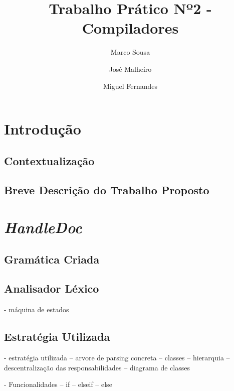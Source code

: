 \documentclass[runningheads]{llncs}
\begin{document}
%
\title{Trabalho Prático Nº2 - Compiladores}
%
%
\author{Marco Sousa \and
José Malheiro \and
Miguel Fernandes}
%
%
\maketitle              %
%
\begin{abstract}

\end{abstract}
%
%
%
\section{Introdução}
\subsection{Contextualização} 



\subsection{Breve Descrição do Trabalho Proposto}



\section{\textit{HandleDoc}}
\subsection{Gramática Criada} \label{subsec:grammar}

\subsection{Analisador Léxico} \label{subsec:lex}
- máquina de estados

\subsection{Estratégia Utilizada} \label{subsec:strat}
- estratégia utilizada
-- arvore de parsing concreta
-- classes
-- hierarquia
-- descentralização das responsabilidades
-- diagrama de classes

- Funcionalidades
-- if 
-- elseif
-- else 
\end{document}
